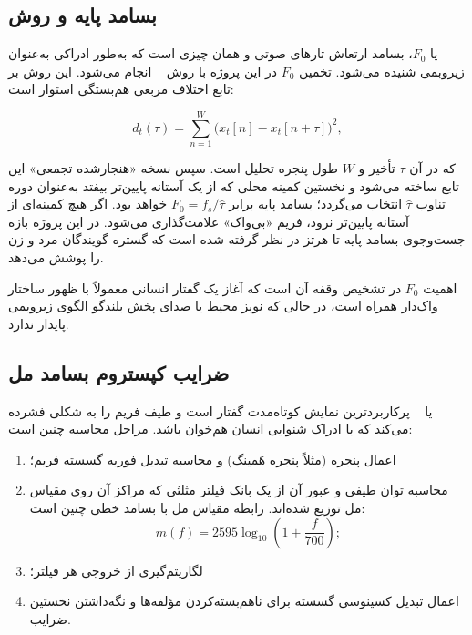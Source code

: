 \subsection{بسامد پایه و روش }

 یا $F_0$، بسامد ارتعاش تارهای صوتی و همان چیزی است که به‌طور
ادراکی به‌عنوان زیر‌و‌بمی شنیده می‌شود. تخمین $F_0$ در این پروژه با روش
~\cite{decheveigne2002yin} انجام می‌شود. این روش بر تابع اختلاف
مربعی هم‌بستگی استوار است:

\begin{equation}
d_t(\tau) = \sum_{n=1}^{W} \bigl(x_t[n] - x_t[n+\tau]\bigr)^2,
\label{eq:yin-diff}
\end{equation}

که در آن $\tau$ تأخیر و $W$ طول پنجره تحلیل است. سپس نسخه «هنجارشده
تجمعی» این تابع ساخته می‌شود و نخستین کمینه محلی که از یک آستانه پایین‌تر
بیفتد به‌عنوان دوره تناوب $\hat{\tau}$ انتخاب می‌گردد؛ بسامد پایه برابر
$F_0 = f_s / \hat{\tau}$ خواهد بود. اگر هیچ کمینه‌ای از آستانه پایین‌تر
نرود، فریم «بی‌واک» علامت‌گذاری می‌شود. در این پروژه بازه جست‌وجوی
بسامد پایه  تا  هرتز در نظر گرفته شده است که گستره گویندگان
مرد و زن را پوشش می‌دهد.

اهمیت $F_0$ در تشخیص وقفه آن است که آغاز یک گفتار انسانی معمولاً با ظهور
ساختار واک‌دار همراه است، در حالی که نویز محیط یا صدای پخش بلندگو الگوی
زیر‌و‌بمی پایدار ندارد.

\subsection{ضرایب کپستروم بسامد مل}

 یا ~\cite{davis1980mfcc} پرکاربردترین
نمایش کوتاه‌مدت گفتار است و طیف فریم را به شکلی فشرده می‌کند که با ادراک
شنوایی انسان هم‌خوان باشد. مراحل محاسبه چنین است:

\begin{enumerate}
\item اعمال پنجره (مثلاً پنجره هَمینگ) و محاسبه تبدیل فوریه گسسته فریم؛
\item محاسبه توان طیفی و عبور آن از یک بانک فیلتر مثلثی که مراکز آن روی
      مقیاس مل توزیع شده‌اند. رابطه مقیاس مل با بسامد خطی چنین است:
      \begin{equation}
      m(f) = 2595 \log_{10}\!\left(1 + \frac{f}{700}\right);
      \label{eq:mel}
      \end{equation}
\item لگاریتم‌گیری از خروجی هر فیلتر؛
\item اعمال تبدیل کسینوسی گسسته برای ناهم‌بسته‌کردن مؤلفه‌ها و نگه‌داشتن
      نخستین ضرایب.
\end{enumerate}

